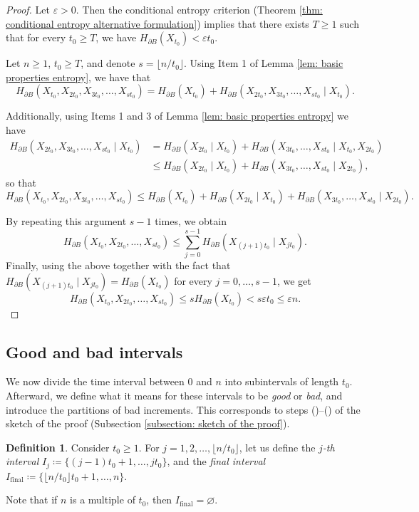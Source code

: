\documentclass[reqno,oneside,11pt]{amsart}
\theoremstyle{plain}
\theoremstyle{definition}
\newtheorem{defn}[thm]{Definition} %
\newcommand{\prange}[2]{(\labelcref{#1})--(\labelcref{#2})}
\begin{document}
\begin{proof}
	Let $\varepsilon>0$. Then the conditional entropy criterion (Theorem \ref{thm: conditional entropy alternative formulation}) implies that there exists $T\ge 1$ such that for every $t_0\ge T$, we have $H_{\partial B}(X_{t_0})<\varepsilon t_0$.
	
	Let $n\ge 1$, $t_0\ge T$, and denote $s=\lfloor n/t_0\rfloor.$ Using Item 1 of Lemma \ref{lem: basic properties entropy}, we have that 
	\[ H_{\partial B}(X_{t_0},X_{2t_0},X_{3t_0},\ldots, X_{st_0})= H_{\partial B}(X_{t_0})+ H_{\partial B}(X_{2t_0},X_{3t_0},\ldots, X_{st_0}\mid X_{t_0}). \]
	
	Additionally, using Items 1 and 3 of Lemma \ref{lem: basic properties entropy} we have
	\begin{align*}
		H_{\partial B}(X_{2t_0},X_{3t_0},\ldots, X_{st_0}\mid X_{t_0})&= H_{\partial B}(X_{2t_0}\mid X_{t_0}) + H_{\partial B}(X_{3t_0},\ldots, X_{st_0}\mid X_{t_0},X_{2t_0})\\
		&\le H_{\partial B}(X_{2t_0}\mid X_{t_0}) + H_{\partial B}(X_{3t_0},\ldots, X_{st_0}\mid X_{2t_0}),
	\end{align*} 
	so that \[ H_{\partial B}(X_{t_0},X_{2t_0},X_{3t_0},\ldots, X_{st_0})\le H_{\partial B}(X_{t_0})+ H_{\partial B}(X_{2t_0}\mid X_{t_0}) + H_{\partial B}(X_{3t_0},\ldots, X_{st_0}\mid X_{2t_0}). \]
	
	By repeating this argument $s-1$ times, we obtain \[H_{\partial B}(X_{t_0},X_{2t_0},\ldots, X_{st_0})\le\sum_{j=0}^{s-1}H_{\partial B}\left(X_{(j+1)t_0}\mid X_{jt_0}\right).\] Finally, using the above together with the fact that $H_{\partial B}\left(X_{(j+1)t_0}\mid X_{jt_0}\right)=H_{\partial B}(X_{t_0})$ for every $j=0,\ldots,s-1$, we get
	\begin{equation*}
		H_{\partial B}(X_{t_0},X_{2t_0},\ldots, X_{st_0})\le sH_{\partial B}(X_{t_0})
		< s\varepsilon t_0\le \varepsilon n.
	\end{equation*}
\end{proof}
\subsection{Good and bad intervals}
We now divide the time interval between $0$ and $n$ into subintervals of length $t_0$. Afterward, we define what it means for these intervals to be \emph{good} or \emph{bad}, and introduce the partitions of bad increments. This corresponds to steps  \prange{step: step 3}{step: step 5} of the sketch of the proof (Subsection \ref{subsection: sketch of the proof}).
\begin{defn}\label{def: time intervals}
	Consider $t_0\ge 1$. For $j=1,2,\ldots,\lfloor n/t_0\rfloor$, let us define the \emph{$j$-th interval} $I_j\coloneqq \{(j-1)t_0+1,\ldots, jt_0\}$, and the \emph{final interval} $I_{\mathrm{final}}\coloneqq \{\lfloor n/t_0\rfloor t_0+1,\ldots, n \}$.
\end{defn}
Note that if $n$ is a multiple of $t_0$, then $I_{\mathrm{final}}=\varnothing$.
\end{document}
